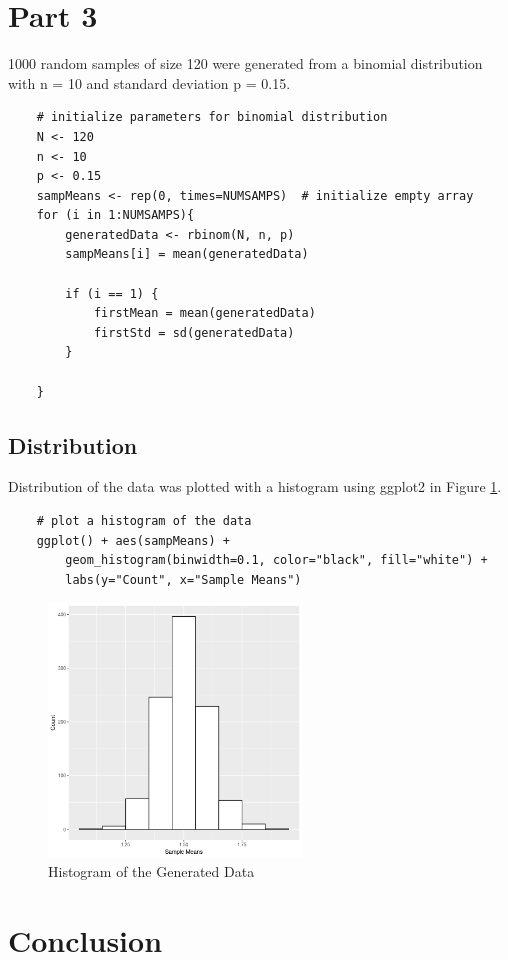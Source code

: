 \documentclass{article}
\begin{document}
    \section{Part 3}
        1000 random samples of size 120 were generated from a binomial distribution with n = 10 and standard deviation p = 0.15.

\begin{lstlisting}
    # initialize parameters for binomial distribution
    N <- 120
    n <- 10
    p <- 0.15
    sampMeans <- rep(0, times=NUMSAMPS)  # initialize empty array
    for (i in 1:NUMSAMPS){
        generatedData <- rbinom(N, n, p)
        sampMeans[i] = mean(generatedData)

        if (i == 1) {
            firstMean = mean(generatedData)
            firstStd = sd(generatedData)
        }

    }
\end{lstlisting}

        

        \subsection{Distribution}
            Distribution of the data was plotted with a histogram using ggplot2 in Figure \ref{fig:hist3}.
\begin{lstlisting}
    # plot a histogram of the data
    ggplot() + aes(sampMeans) + 
        geom_histogram(binwidth=0.1, color="black", fill="white") +
        labs(y="Count", x="Sample Means")
\end{lstlisting}

            \begin{figure}[h]
                \begin{center}
                    \includegraphics[width=0.6\textwidth]{figures/hist3.png}
                    \caption{Histogram of the Generated Data} \label{fig:hist3}
                \end{center}
            \end{figure}


    \section{Conclusion}

    \clearpage
    \newpage
\end{document}
